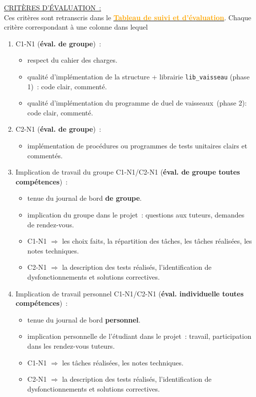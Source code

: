 \documentclass[10pt, fleqn, a4paper]{article}
\newcommand{\bfcolor}[2]{\textcolor{#1}{\textbf{#2}}}
\newcommand\myframecolor{}
\newcommand\mybgcolor{}
\newenvironment{mycolorbox}[2]
{
\def\myframecolor{#1}
\def\mybgcolor{#2}
\begingroup
\begin{lrbox}{\mytextbox}
\begin{minipage}[t]{\textwidth}
}
{
\end{minipage}\end{lrbox}
\fcolorbox{\myframecolor}{\mybgcolor}{\usebox{\mytextbox}}
\endgroup
}
\def\TABLEAUEVAL{\href{https://docs.google.com/spreadsheets/d/18LC7yuCl2cteuaYs7VfMBd0qE6IhRl_J6CCGcIUdCyk/edit?usp=sharing}{\bfcolor{orange}{Tableau de suivi et d'évaluation}}}
\newcounter{quest}
\begin{document}
\begin{mycolorbox}{black}{yellow}
\underline{CRITÈRES D'ÉVALUATION~:}\\
Ces critères sont retranscris dans le \TABLEAUEVAL. Chaque critère correspondant à une colonne dans lequel 
\begin{enumerate}
\item \colorbox{redC1}{C1-N1} (\textbf{éval. de groupe})~: 
\begin{itemize}
\item[\ding{223}] respect du cahier des charges.
\item[\ding{223}] qualité d'implémentation de la structure + librairie \texttt{lib\_vaisseau} (phase 1)~: code clair, commenté.
\item[\ding{223}] qualité d'implémentation du programme de duel de vaisseaux~(phase 2): code clair, commenté.
\end{itemize}
\item \colorbox{greenC2}{C2-N1} (\textbf{éval. de groupe})~: 
\begin{itemize}
\item[\ding{223}] implémentation de procédures ou programmes de tests unitaires clairs et commentés.
\end{itemize}
\item \colorbox{yellowPORTFOLIO}{Implication de travail du groupe} \colorbox{redC1}{C1-N1}/\colorbox{greenC2}{C2-N1} (\textbf{éval. de groupe toutes compétences})~:
\begin{itemize}
\item[\ding{223}] tenue du journal de bord \textbf{de groupe}.
\item[\ding{223}] implication du groupe dans le projet~: questions aux tuteurs, demandes de rendez-vous.
\item[\ding{223}] \colorbox{redC1}{C1-N1} $\Rightarrow$ les choix faits, la répartition des tâches, les tâches réalisées, les notes techniques.
\item[\ding{223}] \colorbox{greenC2}{C2-N1} $\Rightarrow$ la description des tests réalisés, l'identification de dysfonctionnements et solutions correctives.
\end{itemize} 
\item \colorbox{yellowPORTFOLIO}{Implication de travail personnel} \colorbox{redC1}{C1-N1}/\colorbox{greenC2}{C2-N1} (\textbf{éval. individuelle toutes compétences})~:
\begin{itemize}
\item[\ding{223}] tenue du journal de bord \textbf{personnel}.
\item[\ding{223}] implication personnelle de l'étudiant dans le projet~: travail, participation dans les rendez-vous tuteurs.
\item[\ding{223}] \colorbox{redC1}{C1-N1} $\Rightarrow$ les tâches réalisées, les notes techniques.
\item[\ding{223}] \colorbox{greenC2}{C2-N1} $\Rightarrow$ la description des tests réalisés, l'identification de dysfonctionnements et solutions correctives.
\end{itemize}
\end{enumerate}
\end{mycolorbox}
\end{document}
